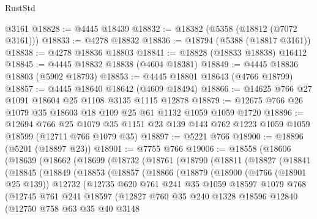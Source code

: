 \begin{lexlean}{RustStd}
\begin{coremodule}
{\begin{coremodule}
{{{{{{{{{{{{{{{{{{{{{{{{{{{{{{{{{{{    @3161
@18828 := @4445 @18439
@18832 := @18382 (@5358 (@18812 (@7072 @3161)))
@18833 := @4278 @18832
@18836 := @18794 (@5388 (@18817 @3161))
@18838 := @4278 @18836 @18803
@18841 := @18828 (@18833 @18838) @16412
@18845 := @4445 @18832 @18838 (@4604 @18381)
@18849 := @4445 @18836 @18803 (@5902 @18793)
@18853 := @4445 @18801 @18643 (@4766 @18799)
@18857 := @4445 @18640 @18642 (@4609 @18494)
@18866 := @14625 @766 @27 @1091 @18604 @25 @1108 @3135 @1115 @12878
@18879 := @12675 @766 @26 @1079 @35 @18603 @18 @109 @25 @61 @1132 @1059 @1059 @1720
@18896 := @12694
    @766
    @25
    @1079
    @35
    @1151
    @23
    @139
    @143
    @762
    @1223
    @1059
    @1059
    @18599
    (@12711 @766 @1079 @35)
@18897 := @5221 @766
@18900 := @18896 (@5201 (@18897 @23))
@18901 := @7755 @766
@19006 := @18558
    (@18606
      (@18639
        (@18662
          (@18699
            (@18732
              (@18761
                (@18790
                  (@18811
                    (@18827
                      (@18841
                        (@18845
                          (@18849
                            (@18853
                              (@18857
                                (@18866
                                  (@18879
                                    (@18900
                                      (@4766 (@18901 @25 @139))
                                      @12732
                                      (@12735
                                        @620
                                        @761
                                        @241
                                        @35
                                        @1059
                                        @18597
                                        @1079
                                        @768
                                        (@12745
                                          @761
                                          @241
                                          @18597
                                          (@12827
                                            @760
                                            @35
                                            @240
                                            @1328
                                            @18596
                                            @12840
                                            (@12750
                                              @758
                                              @63
                                              @35
                                              @40
                                              @3148
}}}}}}}}}}}}}}}}}}}}}}}}}}}}}}}}}}}
\end{coremodule}}
\end{coremodule}
\end{lexlean}

